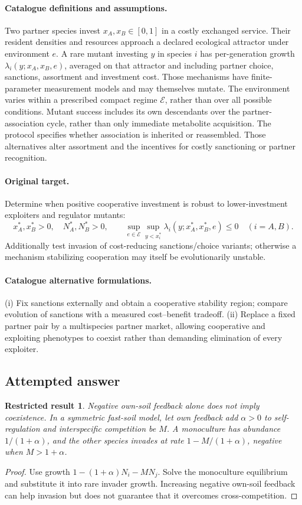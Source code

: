\documentclass[11pt]{article}
\newtheorem{attemptresult}{Restricted result}[section]
\begin{document}
\paragraph{Catalogue definitions and assumptions.}
Two partner species invest $x_A,x_B\in[0,1]$ in a costly exchanged service. Their resident densities and resources approach a declared ecological attractor under environment $e$. A rare mutant investing $y$ in species $i$ has per-generation growth $\lambda_i(y;x_A,x_B,e)$, averaged on that attractor and including partner choice, sanctions, assortment and investment cost. Those mechanisms have finite-parameter measurement models and may themselves mutate. The environment varies within a prescribed compact regime $\mathcal E$, rather than over all possible conditions. Mutant success includes its own descendants over the partner-association cycle, rather than only immediate metabolite acquisition. The protocol specifies whether association is inherited or reassembled. Those alternatives alter assortment and the incentives for costly sanctioning or partner recognition.
\paragraph{Original target.}
Determine when positive cooperative investment is robust to lower-investment exploiters and regulator mutants:
\[
 x_A^*,x_B^*>0,\quad N_A^*,N_B^*>0,\qquad
 \sup_{e\in\mathcal E}\sup_{y<x_i^*}
 \lambda_i(y;x_A^*,x_B^*,e)\le0\quad(i=A,B).
\]
Additionally test invasion of cost-reducing sanctions/choice variants; otherwise a mechanism stabilizing cooperation may itself be evolutionarily unstable.
\paragraph{Catalogue alternative formulations.}
(i) Fix sanctions externally and obtain a cooperative stability region; compare evolution of sanctions with a measured cost--benefit tradeoff. (ii) Replace a fixed partner pair by a multispecies partner market, allowing cooperative and exploiting phenotypes to coexist rather than demanding elimination of every exploiter.
\subsection{Attempted answer}
\begin{attemptresult}
Negative own-soil feedback alone does not imply coexistence. In a symmetric fast-soil model, let own feedback add $\alpha>0$ to self-regulation and interspecific competition be $M$. A monoculture has abundance $1/(1+\alpha)$, and the other species invades at rate $1-M/(1+\alpha)$, negative when $M>1+\alpha$.
\end{attemptresult}
\begin{proof}
Use growth $1-(1+\alpha)N_i-MN_j$. Solve the monoculture equilibrium and substitute it into rare invader growth. Increasing negative own-soil feedback can help invasion but does not guarantee that it overcomes cross-competition.
\end{proof}
\end{document}
